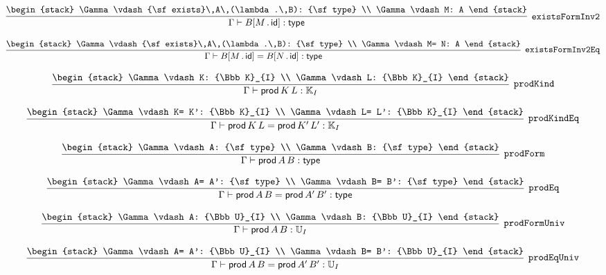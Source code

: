 \[
\infer[{\tt existsFormInv2}]{\Gamma \vdash B[M\,.\,{\sf id}]: {\sf type}}{
\begin{stack}
\Gamma \vdash {\sf exists}\,A\,(\lambda .\,B): {\sf type}
\\
\Gamma \vdash M: A
\end{stack}}
\]

\[
\infer[{\tt existsFormInv2Eq}]{\Gamma \vdash B[M\,.\,{\sf id}]= B[N\,.\,{\sf id}]: {\sf type}}{
\begin{stack}
\Gamma \vdash {\sf exists}\,A\,(\lambda .\,B): {\sf type}
\\
\Gamma \vdash M= N: A
\end{stack}}
\]

\[
\infer[{\tt prodKind}]{\Gamma \vdash {\sf prod}\,K\,L: {\Bbb K}_{I}}{
\begin{stack}
\Gamma \vdash K: {\Bbb K}_{I}
\\
\Gamma \vdash L: {\Bbb K}_{I}
\end{stack}}
\]

\[
\infer[{\tt prodKindEq}]{\Gamma \vdash {\sf prod}\,K\,L= {\sf prod}\,K'\,L': {\Bbb K}_{I}}{
\begin{stack}
\Gamma \vdash K= K': {\Bbb K}_{I}
\\
\Gamma \vdash L= L': {\Bbb K}_{I}
\end{stack}}
\]

\[
\infer[{\tt prodForm}]{\Gamma \vdash {\sf prod}\,A\,B: {\sf type}}{
\begin{stack}
\Gamma \vdash A: {\sf type}
\\
\Gamma \vdash B: {\sf type}
\end{stack}}
\]

\[
\infer[{\tt prodEq}]{\Gamma \vdash {\sf prod}\,A\,B= {\sf prod}\,A'\,B': {\sf type}}{
\begin{stack}
\Gamma \vdash A= A': {\sf type}
\\
\Gamma \vdash B= B': {\sf type}
\end{stack}}
\]

\[
\infer[{\tt prodFormUniv}]{\Gamma \vdash {\sf prod}\,A\,B: {\Bbb U}_{I}}{
\begin{stack}
\Gamma \vdash A: {\Bbb U}_{I}
\\
\Gamma \vdash B: {\Bbb U}_{I}
\end{stack}}
\]

\[
\infer[{\tt prodEqUniv}]{\Gamma \vdash {\sf prod}\,A\,B= {\sf prod}\,A'\,B': {\Bbb U}_{I}}{
\begin{stack}
\Gamma \vdash A= A': {\Bbb U}_{I}
\\
\Gamma \vdash B= B': {\Bbb U}_{I}
\end{stack}}
\]

